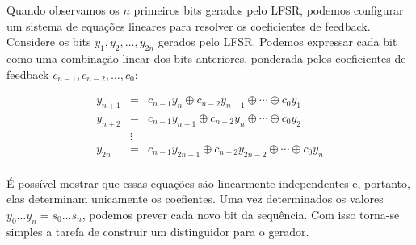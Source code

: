 Quando observamos os $n$ primeiros bits gerados pelo LFSR, podemos configurar um sistema de equações lineares para resolver os coeficientes de feedback.
Considere os bits $y_1, y_2, \dots, y_{2n}$ gerados pelo LFSR.
Podemos expressar cada bit como uma combinação linear dos bits anteriores, ponderada pelos coeficientes de feedback $c_{n-1}, c_{n-2}, \dots, c_0$:

\begin{displaymath}
  \begin{array}{rcl}
    y_{n+1} & = & c_{n-1}y_n \oplus c_{n-2}y_{n-1} \oplus \cdots \oplus c_0 y_1 \\
    y_{n+2} & = & c_{n-1}y_{n+1} \oplus c_{n-2}y_n \oplus \cdots \oplus c_0 y_2 \\
    & \vdots & \\
    y_{2n} & = & c_{n-1}y_{2n-1} \oplus c_{n-2}y_{2n-2} \oplus \cdots \oplus c_0 y_n \\
  \end{array}
\end{displaymath}

É possível mostrar que essas equações são linearmente independentes e, portanto, elas determinam unicamente os coefientes.
Uma vez determinados os valores $y_0 \dots y_n = s_0 \dots s_n$, podemos prever cada novo bit da sequência.
Com isso torna-se simples a tarefa de construir um distinguidor para o gerador.

